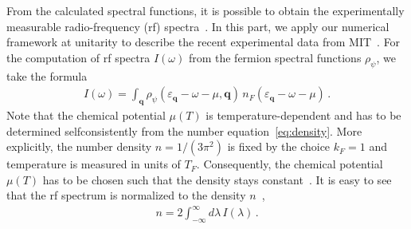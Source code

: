 From the calculated spectral functions, it is possible to obtain the experimentally measurable radio-frequency (rf) spectra~\cite{Punk2007,Schneider2009}. In this part, we apply our numerical framework at unitarity to describe the recent experimental data from MIT~\cite{Mukherjee2019}. For the computation of rf spectra $I(\omega)$ from the fermion spectral functions $\rho_{\psi}$, we take the formula~\cite{Haussmann2009}
%
\begin{align}
	\label{eq:rf-spectra}
	I(\omega) = \int_{\bm{q}} \rho_{\psi}(\varepsilon_{\bm{q}}-\omega-\mu,\bm{q})\, n_F(\varepsilon_{\bm{q}}-\omega-\mu) \,.
\end{align}
%
Note that the chemical potential $\mu(T)$ is temperature-dependent and has to be determined selfconsistently from the number equation~\eqref{eq:density}. More explicitly, the number density $n=1/(3\pi^2)$ is fixed by the choice $k_F=1$ and temperature is measured in units of $T_F$. Consequently, the chemical potential $\mu(T)$ has to be chosen such that the density stays constant~\cite{Tajima2019}. It is easy to see that the rf spectrum is normalized to the density $n$~\cite{Haussmann2009},
%
\begin{align}
	\label{eq:rf-dens}
	n = 2\int_{-\infty}^{\infty} d\lambda\, I(\lambda) \,.
\end{align}
%

